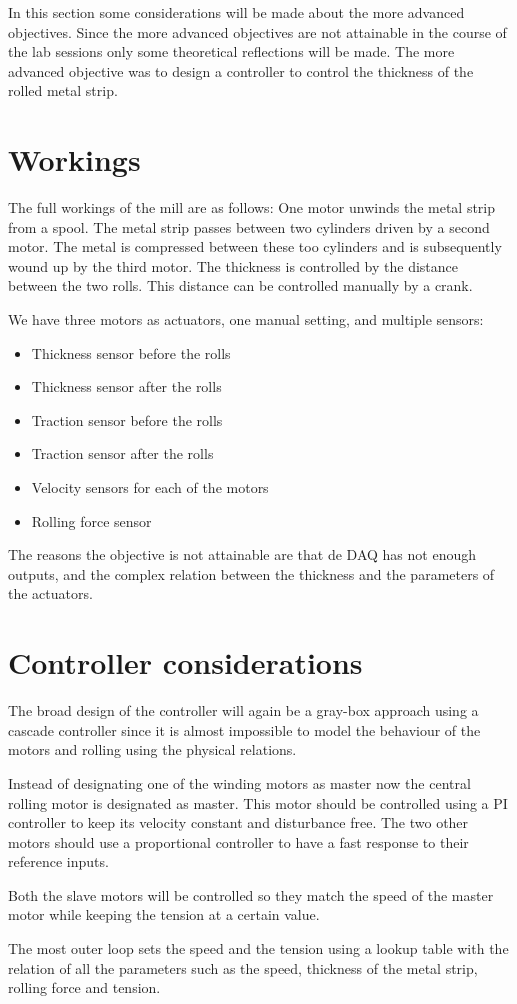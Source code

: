 In this section some considerations will be made about the more advanced objectives. Since the more advanced objectives are not attainable in the course of the lab sessions only some theoretical reflections will be made. The more advanced objective was to design a controller to control the thickness of the rolled metal strip.

\section{Workings}
The full workings of the mill are as follows: One motor unwinds the metal strip from a spool. The metal strip passes between two cylinders driven by a second motor. The metal is compressed between these too cylinders and is subsequently wound up by the third motor. The thickness is controlled by the distance between the two rolls. This distance can be controlled manually by a crank.

We have three motors as actuators, one manual setting, and multiple sensors: 
\begin{itemize}
\item Thickness sensor before the rolls
\item Thickness sensor after the rolls
\item Traction sensor before the rolls
\item Traction sensor after the rolls
\item Velocity sensors for each of the motors
\item Rolling force sensor
\end{itemize}

The reasons the objective is not attainable are that de DAQ has not enough outputs, and the complex relation between the thickness and the parameters of the actuators.

\section{Controller considerations}

The broad design of the controller will again be a gray-box approach using a cascade controller since it is almost impossible to model the behaviour of the motors and rolling using the physical relations.

Instead of designating one of the winding motors as master now the central rolling motor is designated as master. This motor should be controlled using a PI controller to keep its velocity constant and disturbance free. The two other motors should use a proportional controller to have a fast response to their reference inputs.

Both the slave motors will be controlled so they match the speed of the master motor while keeping the tension at a certain value.

The most outer loop sets the speed and the tension using a lookup table with the relation of all the parameters such as the speed, thickness of the metal strip, rolling force and tension.

